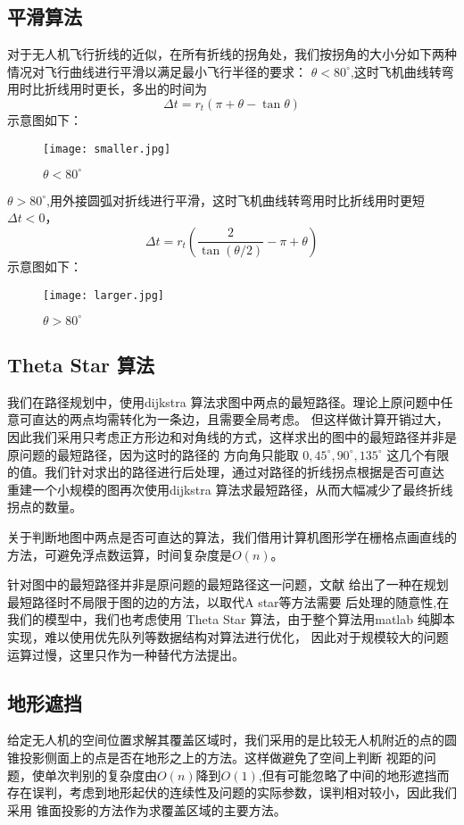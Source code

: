 \subsection{平滑算法}
对于无人机飞行折线的近似，在所有折线的拐角处，我们按拐角的大小分如下两种情况对飞行曲线进行平滑以满足最小飞行半径的要求：
$\theta<80^{\circ}$,这时飞机曲线转弯用时比折线用时更长，多出的时间为
\begin{equation}
\Delta t=r_t(\pi+\theta-\tan\theta)
\end{equation}
示意图如下：
\begin{figure}[!ht]\label{fig:smaller}
\centering
\texttt{[image: smaller.jpg]}
\caption{$\theta<80^{\circ}$}
\end{figure}

$\theta>80^{\circ}$,用外接圆弧对折线进行平滑，这时飞机曲线转弯用时比折线用时更短$\Delta t<0$，
\begin{equation}
\Delta t=r_t(\frac{2}{\tan (\theta/2)}-\pi+\theta)
\end{equation}
示意图如下：
\begin{figure}[!ht]\label{fig:larger}
\centering
\texttt{[image: larger.jpg]}
\caption{$\theta>80^{\circ}$}
\end{figure}

\subsection{Theta Star 算法}
我们在路径规划中，使用dijkstra 算法求图中两点的最短路径。理论上原问题中任意可直达的两点均需转化为一条边，且需要全局考虑。
但这样做计算开销过大，因此我们采用只考虑正方形边和对角线的方式，这样求出的图中的最短路径并非是原问题的最短路径，因为这时的路径的
方向角只能取 $0,45^{\circ},90^{\circ},135^{\circ}$ 这几个有限的值。我们针对求出的路径进行后处理，通过对路径的折线拐点根据是否可直达
重建一个小规模的图再次使用dijkstra 算法求最短路径，从而大幅减少了最终折线拐点的数量。

关于判断地图中两点是否可直达的算法，我们借用计算机图形学在栅格点画直线的方法\cite{Bresenham1965Algorithm}，可避免浮点数运算，时间复杂度是$O(n)$。

针对图中的最短路径并非是原问题的最短路径这一问题，文献\cite{Nash2014Theta} 给出了一种在规划最短路径时不局限于图的边的方法，以取代A star等方法需要
后处理的随意性,在我们的模型中，我们也考虑使用 Theta Star 算法，由于整个算法用matlab 纯脚本实现，难以使用优先队列等数据结构对算法进行优化，
因此对于规模较大的问题运算过慢，这里只作为一种替代方法提出。

\subsection{地形遮挡}
给定无人机的空间位置求解其覆盖区域时，我们采用的是比较无人机附近的点的圆锥投影侧面上的点是否在地形之上的方法。这样做避免了空间上判断
视距的问题，使单次判别的复杂度由$O(n)$降到$O(1)$,但有可能忽略了中间的地形遮挡而存在误判，考虑到地形起伏的连续性及问题的实际参数，误判相对较小，因此我们采用
锥面投影的方法作为求覆盖区域的主要方法。

